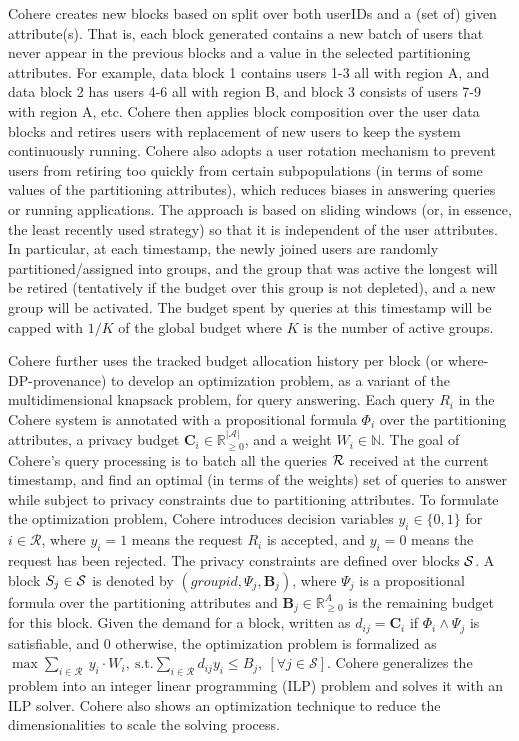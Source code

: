 Cohere creates new blocks based on split over both userIDs and a (set of) given attribute(s).
That is, each block generated contains a new batch of users that never appear in the previous blocks and a value in the selected partitioning attributes.
For example, data block 1 contains users 1-3 all with region A, and data block 2 has users 4-6 all with region B, and block 3 consists of users 7-9 with region A, etc.
Cohere then applies block composition over the user data blocks and retires users with replacement of new users to keep the system continuously running.
Cohere also adopts a user rotation mechanism to prevent users from retiring too quickly from certain subpopulations (in terms of some values of the partitioning attributes), which reduces biases in answering queries or running applications.
The approach is based on sliding windows (or, in essence, the least recently used strategy) so that it is independent of the user attributes.
In particular, at each timestamp, the newly joined users are randomly partitioned/assigned into groups, and the group that was active the longest will be retired (tentatively if the budget over this group is not depleted), and a new group will be activated.
The budget spent by queries at this timestamp will be capped with $1/K$ of the global budget where $K$ is the number of active groups.

Cohere further uses the tracked budget allocation history per block (or where-DP-provenance) to develop an optimization problem, as a variant of the multidimensional knapsack problem, for query answering.
Each query $R_i$ in the Cohere system is annotated with a propositional formula $\Phi_i$ over the partitioning attributes, a privacy budget $\mathbf{C}_i \in \mathbb{R}_{\geq 0}^{|\mathcal{A}|}$, and a weight $W_i \in \mathbb{N}$.
The goal of Cohere's query processing is to batch all the queries $\mathcal{R}$ received at the current timestamp, and find an optimal (in terms of the weights) set of queries to answer while subject to privacy constraints due to partitioning attributes.
To formulate the optimization problem, Cohere introduces decision variables $y_i \in \{0, 1\}$ for $i \in \mathcal{R}$, where $y_i = 1$ means the request $R_i$ is accepted, and $y_i = 0$ means the request has been rejected.
The privacy constraints are defined over blocks $\mathcal{S}$.
A block $S_j \in \mathcal{S}$ is denoted by $(groupid, \Psi_j, \mathbf{B}_j)$, where $\Psi_j$ is a propositional formula over the partitioning attributes and $\mathbf{B}_j \in \mathbb{R}_{\geq 0}^A$ is the remaining budget for this block.
Given the demand for a block, written as $d_{ij} = \mathbf{C}_i$ if $\Phi_i \land \Psi_j$ is satisfiable, and $0$ otherwise, the optimization problem is formalized as $\max \sum_{i \in \mathcal{R}} \ y_i \cdot W_i, ~\text{s.t.} \sum_{i \in \mathcal{R}}  d_{ij} y_i \leq B_j, ~ [\forall j \in \mathcal{S}]$.
Cohere generalizes the problem into an integer linear programming (ILP) problem and solves it with an ILP solver.
Cohere also shows an optimization technique to reduce the dimensionalities to scale the solving process.



